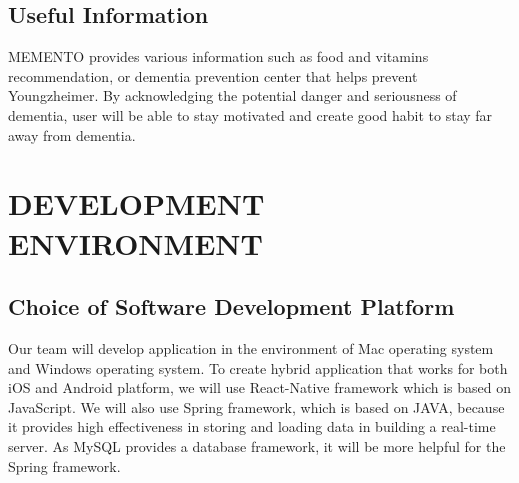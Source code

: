 \documentclass[conference]{IEEEtran}
\begin{document}
\subsection{Useful Information}
MEMENTO provides various information such as food and vitamins recommendation, or dementia prevention center that helps prevent Youngzheimer. By acknowledging the potential danger and seriousness of dementia, user will be able to stay motivated and create good habit to stay far away from dementia.

\section{DEVELOPMENT ENVIRONMENT}
\subsection{Choice of Software Development Platform}

Our team will develop application in the environment of Mac operating system and Windows operating system. To create hybrid application that works for both iOS and Android platform, we will use React-Native framework which is based on JavaScript. We will also use Spring framework, which is based on JAVA, because it provides high effectiveness in storing and loading data in building a real-time server. As MySQL provides a database framework, it will be more helpful for the Spring framework.
\end{document}
